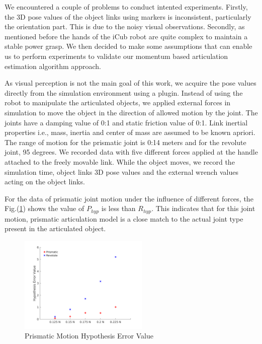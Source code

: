 \documentclass[12pt,a4paper]{report}
\begin{document}
We encountered a couple of problems to conduct intented experiments. Firstly, the 3D pose values of the object links using markers is inconsistent, particularly the orientation part. This is due to the noisy visual observations. Secondly, as mentioned before the hands of the iCub robot are quite complex to maintain a stable power grasp. We then decided to make some assumptions that can enable us to perform experiments to validate our momentum based articulation estimation algorithm approach. 

As visual perception is not the main goal of this work, we acquire the pose values directly from the simulation environment using a plugin. Instead of using the robot to manipulate the articulated objects, we applied external forces in simulation to move the object in the direction of allowed motion by the joint. The joints have a damping value of 0:1 and static friction value of 0:1. Link inertial properties i.e., mass, inertia and center of mass are assumed to be known apriori. The range of motion for the prismatic joint is 0:14 meters and for the revolute joint, 95 degrees. We recorded data with five different forces applied at the handle attached to the freely movable link. While the object moves, we record the simulation time, object links 3D pose values and the external wrench values acting on the object links. 

For the data of prismatic joint motion under the influence of different forces, the Fig.(\ref{phypdiff}) shows the value of $P_{hyp}$ is less than $R_{hyp}$. This indicates that for this joint motion, prismatic articulation model is a close match to the actual joint type present in the articulated object.

\begin{figure}[H]
  \centering
  \includegraphics[width=0.55\textwidth]{figures/phypdiff.png}
  \caption{Prismatic Motion Hypothesis Error Value}
  \label{phypdiff}
\end{figure}
\end{document}
